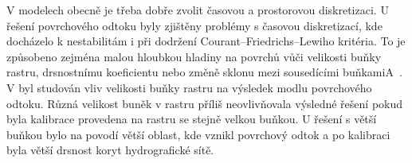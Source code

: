 V modelech obecně je třeba dobře zvolit časovou a prostorovou diskretizaci.  U řešení povrchového odtoku byly zjištěny problémy s časovou diskretizací, kde docházelo k nestabilitám i při dodržení Courant–Friedrichs–Lewiho kritéria. To je způsobeno zejména malou hloubkou hladiny na povrchů vůči velikosti buňky rastru, drsnostnímu koeficientu nebo změně sklonu mezi sousedícími buňkamiA~\cite{zhang1989, esteves2000}. V \cite{molnar2000} byl studován vliv velikosti buňky rastru na výsledek modlu povrchového odtoku. Různá velikost buněk v rastru příliš neovlivňovala výsledné řešení pokud byla kalibrace provedena na rastru se stejně velkou buňkou. U řešení s větší buňkou bylo na povodí větší oblast, kde vznikl povrchový odtok a po kalibraci byla větší drsnost koryt hydrografické sítě.







